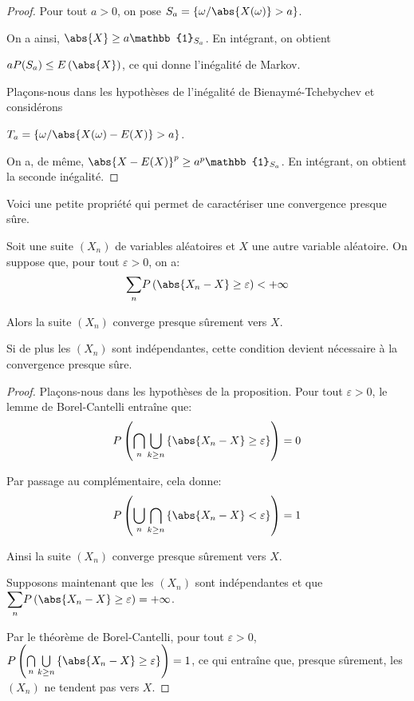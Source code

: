 \begin{proof}
Pour tout $a>0$, on pose $S_a = \left \{\omega/ \abs{X(\omega)}>a \right \}$.

On a ainsi, $\abs{X} \geq a \mathbb{1}_{S_a}$. En intégrant, on obtient 

$a P(S_a) \leq E\left(\abs{X}\right)$, ce qui donne l'inégalité de Markov.

Plaçons-nous dans les hypothèses de l'inégalité de Bienaymé-Tchebychev et considérons 

$T_a = \left \{\omega/ \abs{X(\omega)-E(X)}>a \right \}$.

On a, de même, $\abs{X-E(X)}^p \geq a^p \mathbb{1}_{S_a}$. En intégrant, on obtient la seconde inégalité.
\end{proof}

Voici une petite propriété qui permet de caractériser une convergence presque sûre.

\begin{prop}
\label{caracterisation_convergence_ps}
Soit une suite $(X_n)$ de variables aléatoires et $X$ une autre variable aléatoire. On suppose que, pour tout $\varepsilon>0$, on a:
\[
\displaystyle{\sum \limits_{n}} P\left ( \abs{X_n-X} \geq \varepsilon\right ) < +\infty
\]

Alors la suite $(X_n)$ converge presque sûrement vers $X$.

\medskip
Si de plus les $(X_n)$ sont indépendantes, cette condition devient nécessaire à la convergence presque sûre.
\end{prop}



\begin{proof}
Plaçons-nous dans les hypothèses de la proposition.
Pour tout $\varepsilon>0$, le lemme de Borel-Cantelli entraîne que:
\[
P\left ( \bigcap \limits_{n} \bigcup \limits_{k \geq n} \left \{ \abs{X_n-X} \geq \varepsilon \right \} \right ) = 0
\]

Par passage au complémentaire, cela donne:
\[
P\left ( \bigcup \limits_{n} \bigcap \limits_{k \geq n} \left \{ \abs{X_n-X} < \varepsilon \right \} \right ) = 1
\]

Ainsi la suite $(X_n)$ converge presque sûrement vers $X$.

\medskip
Supposons maintenant que les $(X_n)$ sont indépendantes et que $\displaystyle{\sum \limits_{n}} P\left ( \abs{X_n-X} \geq \varepsilon\right ) = +\infty$. 

Par le théorème de Borel-Cantelli, pour tout $\varepsilon>0$, $P\left ( \bigcap \limits_{n} \bigcup \limits_{k \geq n} \left \{ \abs{X_n-X} \geq \varepsilon \right \} \right ) = 1$, ce qui entraîne que, presque sûrement, les $(X_n)$ ne tendent pas vers $X$.
\end{proof}


